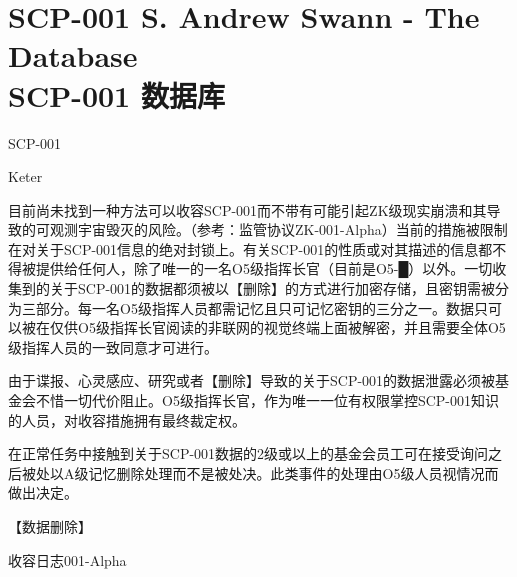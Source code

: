 \chapter[SCP-001 数据库]{
	SCP-001 S. Andrew Swann - The Database\\
	SCP-001 数据库
}

\label{chap:SCP-001.the.database}

SCP-001

Keter

目前尚未找到一种方法可以收容SCP-001而不带有可能引起ZK级现实崩溃和其导致的可观测宇宙毁灭的风险。（参考：监管协议ZK-001-Alpha）当前的措施被限制在对关于SCP-001信息的绝对封锁上。有关SCP-001的性质或对其描述的信息都不得被提供给任何人，除了唯一的一名O5级指挥长官（目前是O5-█）以外。一切收集到的关于SCP-001的数据都须被以【删除】的方式进行加密存储，且密钥需被分为三部分。每一名O5级指挥人员都需记忆且只可记忆密钥的三分之一。数据只可以被在仅供O5级指挥长官阅读的非联网的视觉终端上面被解密，并且需要全体O5级指挥人员的一致同意才可进行。

由于谍报、心灵感应、研究或者【删除】导致的关于SCP-001的数据泄露必须被基金会不惜一切代价阻止。O5级指挥长官，作为唯一一位有权限掌控SCP-001知识的人员，对收容措施拥有最终裁定权。

在正常任务中接触到关于SCP-001数据的2级或以上的基金会员工可在接受询问之后被处以A级记忆删除处理而不是被处决。此类事件的处理由O5级人员视情况而做出决定。

【数据删除】

收容日志001-Alpha

